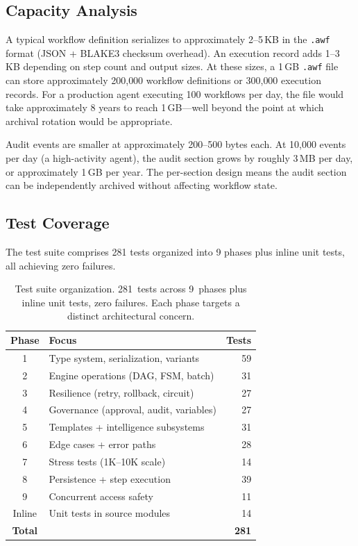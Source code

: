\documentclass[10pt, twocolumn]{article}
\begin{document}
\subsection{Capacity Analysis}\label{sec:capacity}

A typical workflow definition serializes to approximately 2--5\,KB in the \texttt{.awf} format (JSON + BLAKE3 checksum overhead). An execution record adds 1--3\,KB depending on step count and output sizes. At these sizes, a 1\,GB \texttt{.awf} file can store approximately 200{,}000 workflow definitions or 300{,}000 execution records. For a production agent executing 100 workflows per day, the file would take approximately 8 years to reach 1\,GB---well beyond the point at which archival rotation would be appropriate.

Audit events are smaller at approximately 200--500 bytes each. At 10{,}000 events per day (a high-activity agent), the audit section grows by roughly 3\,MB per day, or approximately 1\,GB per year. The per-section design means the audit section can be independently archived without affecting workflow state.

\subsection{Test Coverage}\label{sec:tests}

The test suite comprises 281 tests organized into 9 phases plus inline unit tests, all achieving zero failures.

\begin{table}[t]
\caption{Test suite organization. 281~tests across 9~phases plus inline unit tests, zero failures. Each phase targets a distinct architectural concern.}
\label{tab:tests}
\centering\scriptsize
\begin{tabular}{@{}clr@{}}
\toprule
\textbf{Phase} & \textbf{Focus} & \textbf{Tests} \\
\midrule
1 & Type system, serialization, variants & 59 \\
2 & Engine operations (DAG, FSM, batch) & 31 \\
3 & Resilience (retry, rollback, circuit) & 27 \\
4 & Governance (approval, audit, variables) & 27 \\
5 & Templates + intelligence subsystems & 31 \\
6 & Edge cases + error paths & 28 \\
7 & Stress tests (1K--10K scale) & 14 \\
8 & Persistence + step execution & 39 \\
9 & Concurrent access safety & 11 \\
Inline & Unit tests in source modules & 14 \\
\midrule
\textbf{Total} & & \textbf{281} \\
\bottomrule
\end{tabular}
\end{table}
\end{document}
